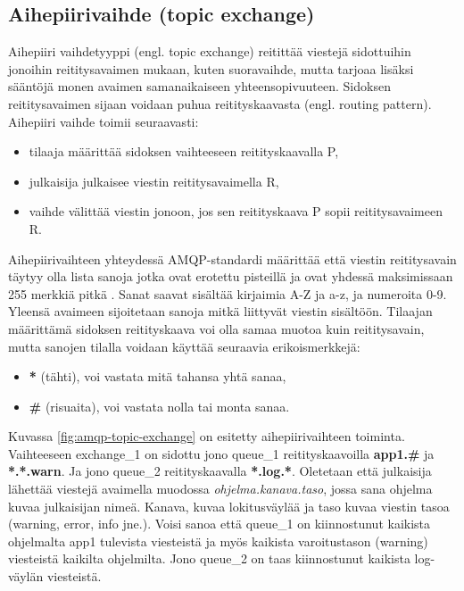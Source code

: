 \subsection{Aihepiirivaihde (topic exchange)}
Aihepiiri vaihdetyyppi (engl. topic exchange) reitittää viestejä sidottuihin jonoihin reititysavaimen mukaan, kuten suoravaihde, mutta tarjoaa lisäksi sääntöjä monen avaimen samanaikaiseen yhteensopivuuteen. Sidoksen reititysavaimen sijaan voidaan puhua reitityskaavasta (engl. routing pattern). Aihepiiri vaihde toimii seuraavasti:
\begin{itemize}
	\item tilaaja määrittää sidoksen vaihteeseen reitityskaavalla P,
	\item julkaisija julkaisee viestin reititysavaimella R,
	\item vaihde välittää viestin jonoon, jos sen reitityskaava P sopii reititysavaimeen R.
\end{itemize}
Aihepiirivaihteen yhteydessä AMQP-standardi määrittää että viestin reititysavain täytyy olla lista sanoja jotka ovat erotettu pisteillä ja ovat yhdessä maksimissaan 255 merkkiä pitkä \cite[s.~35]{AMQP-specification}. Sanat saavat sisältää kirjaimia A-Z ja a-z, ja numeroita 0-9. Yleensä avaimeen sijoitetaan sanoja mitkä liittyvät viestin sisältöön. Tilaajan määrittämä sidoksen reitityskaava voi olla samaa muotoa kuin reititysavain, mutta sanojen tilalla voidaan käyttää seuraavia erikoismerkkejä:
\begin{itemize}
	\item \textbf{*} (tähti), voi vastata mitä tahansa yhtä sanaa,
	\item \textbf{\#} (risuaita), voi vastata nolla tai monta sanaa. \cite[s.~27]{AMQP-specification}
\end{itemize}

Kuvassa \ref{fig:amqp-topic-exchange} on esitetty aihepiirivaihteen toiminta. Vaihteeseen exchange\_1 on sidottu jono queue\_1 reitityskaavoilla \textbf{app1.\#} ja \textbf{*.*.warn}. Ja jono queue\_2 reitityskaavalla \textbf{*.log.*}. Oletetaan että julkaisija lähettää viestejä avaimella muodossa \emph{ohjelma.kanava.taso}, jossa sana ohjelma kuvaa julkaisijan nimeä. Kanava, kuvaa lokitusväylää ja taso kuvaa viestin tasoa (warning, error, info jne.). Voisi sanoa että queue\_1 on kiinnostunut kaikista ohjelmalta app1 tulevista viesteistä ja myös kaikista varoitustason (warning) viesteistä kaikilta ohjelmilta. Jono queue\_2 on taas kiinnostunut kaikista log-väylän viesteistä.

